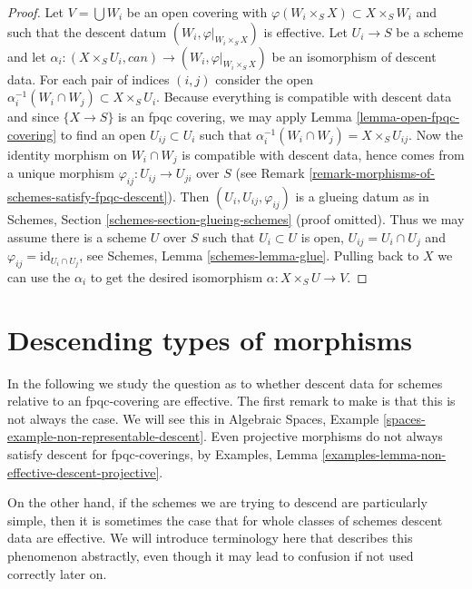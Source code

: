 \begin{proof}
Let $V = \bigcup W_i$ be an open covering with
$\varphi(W_i \times_S X) \subset X \times_S W_i$
and such that the descent datum $(W_i, \varphi|_{W_i \times_S X})$
is effective. Let $U_i \to S$ be a scheme and let
$\alpha_i : (X \times_S U_i, can) \to (W_i, \varphi|_{W_i \times_S X})$
be an isomorphism of descent data. For each pair of indices
$(i, j)$ consider the open
$\alpha_i^{-1}(W_i \cap W_j) \subset X \times_S U_i$.
Because everything is compatible with descent data
and since $\{X \to S\}$ is an fpqc covering, we
may apply Lemma \ref{lemma-open-fpqc-covering}
to find an open $U_{ij} \subset U_i$ such that
$\alpha_i^{-1}(W_i \cap W_j) = X \times_S U_{ij}$.
Now the identity morphism on $W_i \cap W_j$ is
compatible with descent data, hence comes from a
unique morphism $\varphi_{ij} : U_{ij} \to U_{ji}$ over $S$
(see Remark \ref{remark-morphisms-of-schemes-satisfy-fpqc-descent}).
Then $(U_i, U_{ij}, \varphi_{ij})$ is a glueing
datum as in Schemes, Section \ref{schemes-section-glueing-schemes}
(proof omitted). Thus we may assume there is a scheme $U$ over $S$
such that $U_i \subset U$ is open, $U_{ij} = U_i \cap U_j$ and
$\varphi_{ij} = \text{id}_{U_i \cap U_j}$, see
Schemes, Lemma \ref{schemes-lemma-glue}.
Pulling back to $X$ we can use the $\alpha_i$ to
get the desired isomorphism $\alpha : X \times_S U \to V$.
\end{proof}







\section{Descending types of morphisms}
\label{section-descending-types-morphisms}

\noindent
In the following we study the question as to whether
descent data for schemes relative to an fpqc-covering
are effective. The first remark to make is that this
is not always the case. We will see this in Algebraic
Spaces, Example \ref{spaces-example-non-representable-descent}.
Even projective morphisms do not always satisfy descent
for fpqc-coverings, by Examples,
Lemma \ref{examples-lemma-non-effective-descent-projective}.

\medskip\noindent
On the other hand, if the schemes we are trying to
descend are particularly simple, then it is sometimes the
case that for whole classes of schemes descent data
are effective. We will introduce terminology here that
describes this phenomenon abstractly, even though it
may lead to confusion if not used correctly later on.

